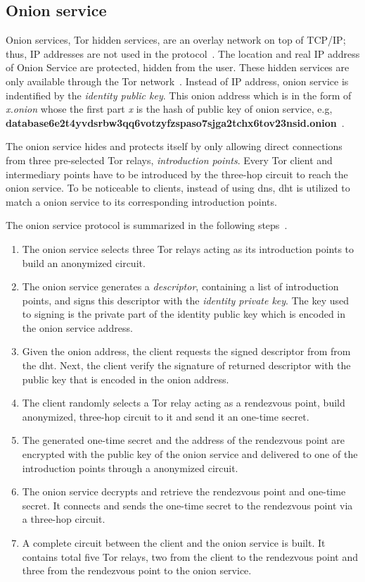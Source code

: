 \subsection{Onion service}
%
Onion services, Tor hidden services, are an overlay network on top of TCP/IP;
thus, IP addresses are not used in the protocol~\cite{web:onion_service}. The
location and real IP address of Onion Service are protected, hidden from the
user. These hidden services are only available through the Tor network~\cite{paper:tor_design}.
Instead of IP address, onion service is indentified by the \emph{identity public key}.
This onion address which is in the form of \emph{x.onion} whose the first part \emph{x} is
the hash of public key of onion service, e.g, {\scriptsize \textbf{
database6e2t4yvdsrbw3qq6votzyfzspaso7sjga2tchx6tov23nsid.onion}}~\cite{dis:usage_of_onion_services}.

The onion service hides and protects itself by only allowing direct connections
from three pre-selected Tor relays, \emph{introduction points}. Every Tor client
and intermediary points have to be introduced by the three-hop circuit to reach
the onion service.
To be noticeable to clients, instead of using \gls{dns}, \gls{dht} is utilized
to match a onion service to its corresponding introduction points.

The onion service protocol is summarized in the following steps~\cite{paper:tor_design}.
\begin{enumerate}
    \item The onion service selects three Tor relays acting as its introduction
    points to build an anonymized circuit.
    \item The onion service generates a \emph{descriptor}, containing a list of
    introduction points, and signs this descriptor with the \emph{identity private
    key}. The key used to signing is the private part of the identity public key
    which is encoded in the onion service address.
    \item Given the onion address, the client requests the signed descriptor from
    from the \acrshort{dht}. Next, the client verify the signature of returned
    descriptor with the public key that is encoded in the onion address.
    \item The client randomly selects a Tor relay acting as a rendezvous point,
    build anonymized, three-hop circuit to it and send it an one-time secret.
    \item The generated one-time secret and the address of the rendezvous point
    are encrypted with the public key of the onion service and delivered to one of
    the introduction points through a anonymized circuit.
    \item The onion service decrypts and retrieve the rendezvous point and one-time
    secret. It connects and sends the one-time secret to the rendezvous point via
    a three-hop circuit.
    \item A complete circuit between the client and the onion service is built.
    It contains total five Tor relays, two from the client to the rendezvous point
    and three from the rendezvous point to the onion service. 
\end{enumerate}

